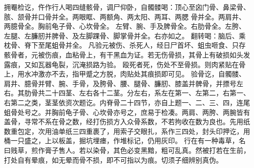 \documentclass[12pt,UTF8]{ctexbook}
\begin{document}
拥罨检讫，仵作行人喝四缝骸骨，调尸仰卧，自髑髅喝：顶心至囟门骨、鼻梁骨、胲、颔骨并口骨并全。两眼眶、两额角、两太阳、两耳、两腮 骨并全。两肩井、两臆骨全。胸前龟子骨、心坎骨全。
左臂、腕、手及脾骨全。右肋骨全。左胯、左腿、左臁肕并脾骨、及左脚踝骨、脚掌骨并全。右亦如之。
翻转喝：脑后、乘枕骨、脊下至尾蛆骨并全。
凡验元被伤、杀死人，经日尸首坏、蛆虫咂食、只存骸骨者，元被伤痕，血粘骨上，有干黑血为证。若无伤骨损，其骨上有破损如头发露痕，又如瓦器龟裂，沉淹损路为验。
殴死者死，伤处不至骨损。则肉紧贴在骨上，用水冲激亦不去，指甲蹙之方脱，肉贴处其痕损即可见。
验骨讫，自髑髅、肩井、臆骨并臂、腕、手骨，及胯骨、腰、腿骨、臁肕、膝盖并髀骨，并摽号左右。其肋骨共二十四茎、左右各十二茎。分左右，系左在第一、左第二，右第一、右第二之类，茎茎依资次题讫。内脊骨二十四节，亦自上题一、二、三、四，连尾蛆骨处号之。并胸前龟子骨、心坎骨亦号之，庶易于检凑。两肩、两胯、两腕皆有盖骨，寻常不系在骨之数，经打伤损方入众骨系数，不若拘收在数为良也。先用纸数重包定，次用油单纸三四重裹了，用索子交眼扎，系作三四处，封头印押讫，用桶一只盛之，上以板盖，掘坑埋瘗，作堆标记，仍用灰印。
行在有一种毒草，名曰贱草，煎作膏子售人。若以染骨，其色必变黑黯，粗可乱真。然被打若在生前，打处自有晕痕，如无晕而骨不损，即不可指以为痕。切须子细辨别真伪。
\end{document}
